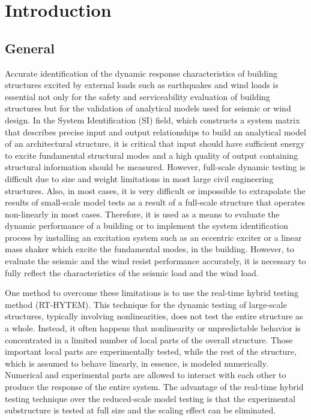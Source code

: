 \chapter{Introduction}
\label{chap:intro}
\section{General}
Accurate identification of the dynamic response characteristics of building structures excited by external loads such as earthquakes and wind loads is essential not only for the safety and serviceability evaluation of building structures but for the validation of analytical models used for seismic or wind design\citep{ljung1987system}. In the System Identification (SI) field, which constructs a system matrix that describes precise input and output relationships to build an analytical model of an architectural structure, it is critical that input should have sufficient energy to excite fundamental structural modes and a high quality of output containing structural information should be measured\citep{alvin1994second,madenci1994free}. However, full-scale dynamic testing is difficult due to size and weight limitations in most large civil engineering structures. Also, in most cases, it is very difficult or impossible to extrapolate the results of small-scale model tests as a result of a full-scale structure that operates non-linearly in most cases. Therefore, it is used as a means to evaluate the dynamic performance of a building or to implement the system identification process by installing an excitation system such as an eccentric exciter or a linear mass shaker which excite the fundamental modes, in the building. However, to evaluate the seismic and the wind resist performance accurately, it is necessary to fully reflect the characteristics of the seismic load and the wind load.

One method to overcome these limitations is to use the real-time hybrid testing method (RT-HYTEM). This technique for the dynamic testing of large-scale structures, typically involving nonlinearities, does not test the entire structure as a whole. Instead, it often happens that nonlinearity or unpredictable behavior is concentrated in a limited number of local parts of the overall structure. Those important local parts are experimentally tested, while the rest of the structure, which is assumed to behave linearly, in essence, is modeled numerically. Numerical and experimental parts are allowed to interact with each other to produce the response of the entire system. The advantage of the real-time hybrid testing technique over the reduced-scale model testing is that the experimental substructure is tested at full size and the scaling effect can be eliminated. 

